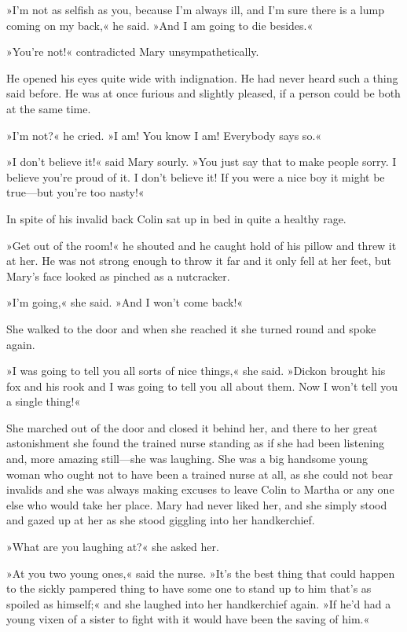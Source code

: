 »I'm not as selfish as you, because I'm always ill, and I'm sure there is a lump coming on my back,« he said. »And I am going to die besides.«

»You're not!« contradicted Mary unsympathetically.

He opened his eyes quite wide with indignation. He had never heard such a thing said before. He was at once furious and slightly pleased, if a person could be both at the same time.

»I'm not?« he cried. »I am! You know I am! Everybody says so.«

»I don't believe it!« said Mary sourly. »You just say that to make people sorry. I believe you're proud of it. I don't believe it! If you were a nice boy it might be true—but you're too nasty!«

In spite of his invalid back Colin sat up in bed in quite a healthy rage.

»Get out of the room!« he shouted and he caught hold of his pillow and threw it at her. He was not strong enough to throw it far and it only fell at her feet, but Mary's face looked as pinched as a nutcracker.

»I'm going,« she said. »And I won't come back!«

She walked to the door and when she reached it she turned round and spoke again.

»I was going to tell you all sorts of nice things,« she said. »Dickon brought his fox and his rook and I was going to tell you all about them. Now I won't tell you a single thing!«

She marched out of the door and closed it behind her, and there to her great astonishment she found the trained nurse standing as if she had been listening and, more amazing still—she was laughing. She was a big handsome young woman who ought not to have been a trained nurse at all, as she could not bear invalids and she was always making excuses to leave Colin to Martha or any one else who would take her place. Mary had never liked her, and she simply stood and gazed up at her as she stood giggling into her handkerchief.

»What are you laughing at?« she asked her.

»At you two young ones,« said the nurse. »It's the best thing that could happen to the sickly pampered thing to have some one to stand up to him that's as spoiled as himself;« and she laughed into her handkerchief again. »If he'd had a young vixen of a sister to fight with it would have been the saving of him.«


